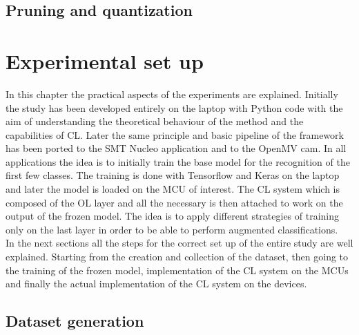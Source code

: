 \documentclass[12pt]{report}
\begin{document}
\section{Pruning and quantization}





\chapter{Experimental set up}

In this chapter the practical aspects of the experiments are explained. Initially the study has been developed entirely on the laptop with Python code with the aim of understanding the theoretical behaviour of the method and the capabilities of CL. Later the same principle and basic pipeline of the framework has been ported to the SMT Nucleo application and to the OpenMV cam. In all applications the idea is to initially train the base model for the recognition of the first few classes. The training is done with Tensorflow and Keras on the laptop and later the model is loaded on the MCU of interest. The CL system which is composed of the OL layer and all the necessary is then attached to work on the output of the frozen model. The idea is to apply different strategies of training only on the last layer in order to be able to perform augmented classifications.  \\
In the next sections all the steps for the correct set up of the entire study are well explained. Starting from the creation and collection of the dataset, then going to the training of the frozen model, implementation of the CL system on the MCUs and finally the actual implementation of the CL system on the devices. 

\section{Dataset generation}
\end{document}
